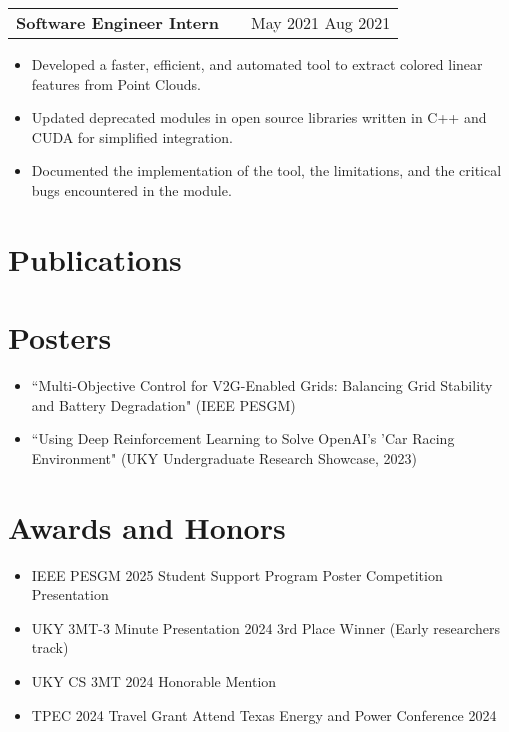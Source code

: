 \documentclass[a4paper,12pt]{article}
\makeatletter
\newenvironment{joblong}[2]
    {
    \begin{tabularx}{\linewidth}{@{}l X r@{}}
    \textbf{#1} & \hfill &  #2 \\[3.75pt]
    \end{tabularx}
    \begin{minipage}[t]{\linewidth}
    \begin{itemize}[nosep,after=\strut, leftmargin=1em, itemsep=3pt,label=--]
    }
    {
    \end{itemize}
    \end{minipage}    
    }
\makeatother
\begin{document}
\begin{joblong}{Software Engineer Intern}{May 2021 Aug 2021} %
\item Developed a faster, efficient, and automated tool to extract colored linear features from Point Clouds. %
\item Updated deprecated modules in open source libraries written in C++ and CUDA for simplified integration. %
\item Documented the implementation of the tool, the limitations, and the critical bugs encountered in the module. %
\end{joblong}

\section{Publications}
\begin{refsection}
\nocite{*} %
\printbibliography[heading=none]
\end{refsection}

\section{Posters}
\begin{itemize}[nosep,after=\strut, leftmargin=1em, itemsep=3pt,label=--]
\item ``Multi-Objective Control for V2G-Enabled Grids: Balancing Grid Stability and Battery Degradation" (IEEE PESGM) %
\item ``Using Deep Reinforcement Learning to Solve OpenAI's 'Car Racing Environment" (UKY Undergraduate Research Showcase, 2023) %
\end{itemize}

\section{Awards and Honors}
\begin{itemize}[nosep,after=\strut, leftmargin=1em, itemsep=3pt,label=--]
\item IEEE PESGM 2025 Student Support Program Poster Competition Presentation %
\item UKY 3MT-3 Minute Presentation 2024 3rd Place Winner (Early researchers track) %
\item UKY CS 3MT 2024 Honorable Mention %
\item TPEC 2024 Travel Grant Attend Texas Energy and Power Conference 2024 %
\end{itemize}
\end{document}
